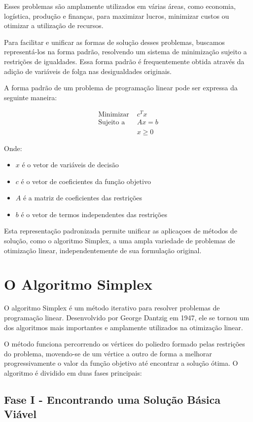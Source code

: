 \documentclass{article}
\begin{document}
Esses problemas são amplamente utilizados em várias áreas, como economia, logística, produção e finanças, para maximizar lucros, minimizar custos ou otimizar a utilização de recursos.


Para facilitar e unificar as formas de solução desses problemas, buscamos representá-los na forma padrão, resolvendo um sistema de minimização sujeito a restrições de igualdades. Essa forma padrão é frequentemente obtida através da adição de variáveis de folga nas desigualdades originais.

A forma padrão de um problema de programação linear pode ser expressa da seguinte maneira:

\begin{align*}
\text{Minimizar } & c^T x \\
\text{Sujeito a } & Ax = b \\
& x \geq 0
\end{align*}

Onde:
\begin{itemize}
    \item $x$ é o vetor de variáveis de decisão
    \item $c$ é o vetor de coeficientes da função objetivo
    \item $A$ é a matriz de coeficientes das restrições
    \item $b$ é o vetor de termos independentes das restrições
\end{itemize}

Esta representação padronizada permite unificar as aplicaçoes de métodos de solução, como o algoritmo Simplex, a uma ampla variedade de problemas de otimização linear, independentemente de sua formulação original.


\section{O Algoritmo Simplex}

O algoritmo Simplex é um método iterativo para resolver problemas de programação linear. Desenvolvido por George Dantzig em 1947, ele se tornou um dos algoritmos mais importantes e amplamente utilizados na otimização linear.

O método funciona percorrendo os vértices do poliedro formado pelas restrições do problema, movendo-se de um vértice a outro de forma a melhorar progressivamente o valor da função objetivo até encontrar a solução ótima. O algoritmo é dividido em duas fases principais:

\subsection{Fase I - Encontrando uma Solução Básica Viável}
\end{document}
